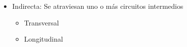 \documentclass[10pt,portrait, twocolumn]{article}
\begin{document}
\begin{landscape}
\begin{multicols}{3}
\begin{itemize}
\begin{itemize}
			\item Indirecta: Se atraviesan uno o más circuitos intermedios
			
				\begin{itemize}
					\item Transversal
					
%	
%	
					
					\item Longitudinal
					
%	
%	
%								


\end{itemize}
\end{itemize}
\end{itemize}
\end{multicols}
\end{landscape}
\end{document}
